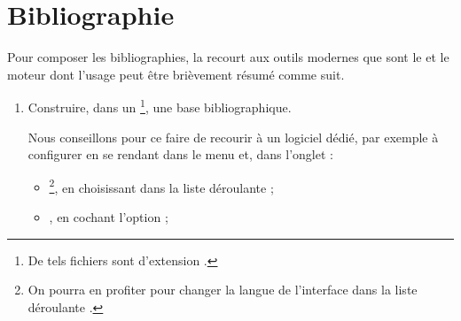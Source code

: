 \documentclass[french,nolocaltoc]{nwejmart}
\newtheorem[title=Fait,style=definition]{fact}
\begin{document}
\section{Bibliographie}
\label{sec-bibliographie}

Pour composer les bibliographies, la \nwejmauthorcl{} recourt aux outils
modernes que sont le  et le moteur  dont
l'usage peut être brièvement résumé comme suit\autocite[Pour plus de détails,
cf. par exemple][en français]{Bitouze}.
\begin{enumerate}
\item Construire, dans un \footnote{De tels
    fichiers sont d'extension .}, une base bibliographique.

  Nous conseillons pour ce faire de recourir à un logiciel dédié, par exemple
  \href{http://jabref.sourceforge.net/}{} à configurer en se
  rendant dans le menu  et, dans l'onglet :
  \begin{itemize}
  \item {}\footnote{On pourra en profiter pour changer la langue de
      l'interface dans la liste déroulante .}, en choisissant
     dans la liste déroulante  ;
  \item {}, en cochant l'option  ;
  \end{itemize}


\end{enumerate}
\end{document}
